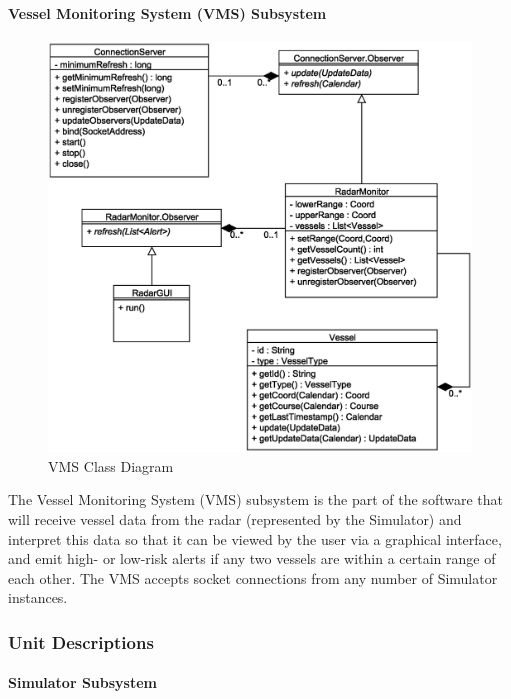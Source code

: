 \documentclass{article}
\begin{document}
\paragraph{Vessel Monitoring System (VMS) Subsystem}

\begin{figure}[!htb]
\caption{VMS Class Diagram}
\centering
\includegraphics[scale=0.6]{diagrams/vms-class-diagram.eps}
\end{figure}

The Vessel Monitoring System (VMS) subsystem is the part of the software that will receive vessel data from the radar (represented by the Simulator) and interpret this data so that it can be viewed by the user via a graphical interface, and emit high- or low-risk alerts if any two vessels are within a certain range of each other. The VMS accepts socket connections from any number of Simulator instances.

\break

\subsubsection{Unit Descriptions} %

\paragraph{Simulator Subsystem}
\end{document}

